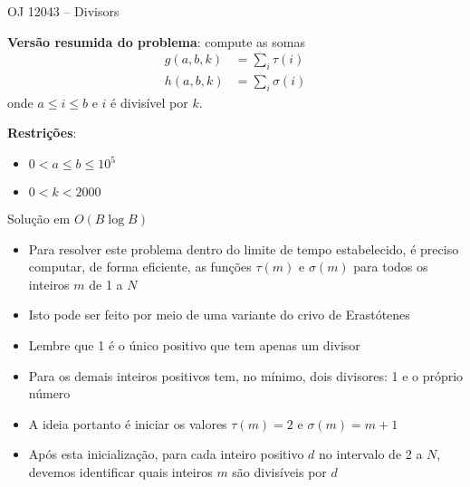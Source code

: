 \begin{frame}[fragile]{OJ 12043 -- Divisors}

    \textbf{Versão resumida do problema}: compute as somas
    \begin{align*}
        g(a, b, k) &= \sum_i \tau(i) \\
        h(a, b, k) &= \sum_i \sigma(i)
    \end{align*}
    onde $a\leq i\leq b$ e $i$ é divisível por $k$.

    \vspace{0.1in}

    \textbf{Restrições}:
    \begin{itemize}
        \item $0 < a \leq b\leq 10^5$
        \item $0 < k < 2000$
    \end{itemize}
\end{frame}

\begin{frame}[fragile]{Solução em $O(B\log B)$}

    \begin{itemize}
        \item Para resolver este problema dentro do limite de tempo estabelecido, é preciso
            computar, de forma eficiente, as funções $\tau(m)$ e $\sigma(m)$ para todos 
            os inteiros $m$ de 1 a $N$

        \item Isto pode ser feito por meio de uma variante do crivo de Erastótenes

        \item Lembre que 1 é o único positivo que tem apenas um divisor

        \item Para os demais inteiros positivos tem, no mínimo, dois divisores: 1 e o próprio
            número

        \item A ideia portanto é iniciar os valores $\tau(m) = 2$ e $\sigma(m) = m + 1$

        \item Após esta inicialização, para cada inteiro positivo $d$ no intervalo de 2 a $N$,
            devemos identificar quais inteiros $m$ são divisíveis por $d$
    \end{itemize}

\end{frame}

